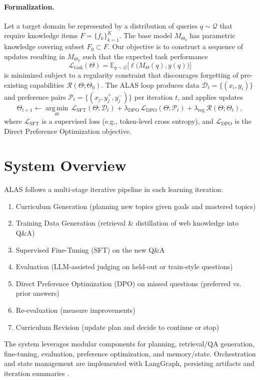 \documentclass[11pt]{article}
\begin{document}
\paragraph{Formalization.} Let a target domain be represented by a distribution of queries \(q \sim \mathcal{Q}\) that require knowledge items \(F=\{f_k\}_{k=1}^K\). The base model \(M_{\Theta_0}\) has parametric knowledge covering subset \(F_0 \subset F\). Our objective is to construct a sequence of updates resulting in \(M_{\Theta_T}\) such that the expected task performance
\[
  \mathcal{L}_{\text{task}}(\Theta) 
  = \mathbb{E}_{q \sim \mathcal{Q}}\big[ \ell\big(M_{\Theta}(q), y(q)\big) \big]
\]
is minimized subject to a regularity constraint that discourages forgetting of pre-existing capabilities \(\mathcal{R}(\Theta;\Theta_0)\). The ALAS loop produces data \(\mathcal{D}_t = \{(x_i, y_i)\}\) and preference pairs \(\mathcal{P}_t = \{(x_j, y_j^+, y_j^-)\}\) per iteration \(t\), and applies updates
\[
  \Theta_{t+1} \leftarrow \operatorname*{arg\,min}_{\Theta}\, 
  \mathcal{L}_{\text{SFT}}(\Theta;\mathcal{D}_t) 
  + \lambda_{\text{DPO}}\, \mathcal{L}_{\text{DPO}}(\Theta;\mathcal{P}_t)
  + \lambda_{\text{reg}}\, \mathcal{R}(\Theta;\Theta_t),
\]
where \(\mathcal{L}_{\text{SFT}}\) is a supervised loss (e.g., token-level cross entropy), and \(\mathcal{L}_{\text{DPO}}\) is the Direct Preference Optimization objective.

\section{System Overview}
ALAS follows a multi-stage iterative pipeline in each learning iteration:
\begin{enumerate}
  \item Curriculum Generation (planning new topics given goals and mastered topics)
  \item Training Data Generation (retrieval \& distillation of web knowledge into Q\&A)
  \item Supervised Fine-Tuning (SFT) on the new Q\&A
  \item Evaluation (LLM-assisted judging on held-out or train-style questions)
  \item Direct Preference Optimization (DPO) on missed questions (preferred vs. prior answers)
  \item Re-evaluation (measure improvements)
  \item Curriculum Revision (update plan and decide to continue or stop)
\end{enumerate}
The system leverages modular components for planning, retrieval/QA generation, fine-tuning, evaluation, preference optimization, and memory/state. Orchestration and state management are implemented with LangGraph, persisting artifacts and iteration summaries \citep{langgraph_docs}.
\end{document}
